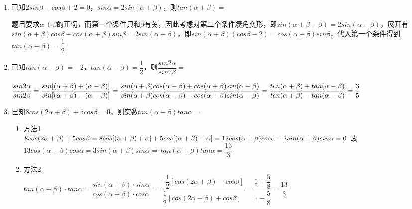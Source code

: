\begin{enumerate}
\begin{enumerate}
        \item 已知$2sin\beta - cos\beta + 2 = 0$，$sin\alpha = 2sin(\alpha + \beta)$，则$tan(\alpha+\beta) = $
        \begin{jieda}
            题目要求$\alpha + \beta$的正切，而第一个条件只和$\beta$有关，因此考虑对第二个条件凑角变形，即$sin(\alpha + \beta - \beta) = 2sin(\alpha + \beta)$，展开有$sin(\alpha+\beta)cos\beta-cos(\alpha+\beta)sin\beta = 2sin(\alpha+\beta)$，即$sin(\alpha + \beta)(cos\beta - 2) = cos(\alpha+\beta)sin\beta$，代入第一个条件得到$tan(\alpha+\beta) = \dfrac{1}{2}$
        \end{jieda}
        \item 已知$tan(\alpha + \beta) = -2$，$tan(\alpha - \beta) = \dfrac{1}{2}$，则$\dfrac{sin2\alpha}{sin2\beta} = $
        \begin{jieda}
            $\dfrac{sin2\alpha}{sin2\beta} = \dfrac{sin[(\alpha + \beta) + (\alpha - \beta)]}{sin[(\alpha + \beta) - (\alpha - \beta)]} = \dfrac{sin(\alpha+\beta)cos(\alpha - \beta) + cos(\alpha + \beta) sin(\alpha - \beta)}{sin(\alpha+\beta)cos(\alpha - \beta) - cos(\alpha + \beta) sin(\alpha - \beta)} \\
            = \dfrac{tan(\alpha+\beta)+tan(\alpha - \beta)}{tan(\alpha+\beta)-tan(\alpha - \beta)} = \dfrac{3}{5}$
        \end{jieda}
        \item 已知$8cos(2\alpha+\beta)+5cos\beta = 0$，则实数$tan(\alpha+\beta)tan\alpha$ = 
        \begin{jieda}
            \begin{enumerate}
                \item 方法1 \\
                $8cos(2\alpha+\beta)+5cos\beta = 8cos[(\alpha+\beta)+\alpha]+5cos[(\alpha+\beta)-\alpha] \\
                = 13cos(\alpha+\beta)cos\alpha - 3sin(\alpha+\beta)sin\alpha = 0$
                故$13cos(\alpha+\beta)cos\alpha = 3sin(\alpha+\beta)sin\alpha \Longrightarrow tan(\alpha+\beta)tan\alpha = \dfrac{13}{3}$
                \item 方法2 \\
                $tan(\alpha + \beta) \cdot tan\alpha = \dfrac{sin(\alpha+\beta) \cdot sin\alpha}{cos(\alpha + \beta) \cdot cos\alpha} = \dfrac{-\dfrac{1}{2}[cos(2\alpha+\beta) - cos\beta]}{\dfrac{1}{2}[cos(2\alpha+\beta) + cos\beta]} = \dfrac{1 + \dfrac{5}{8}}{1 - \dfrac{5}{8}} = \dfrac{13}{3}$
            \end{enumerate}

\end{jieda}
\end{enumerate}
\end{enumerate}
